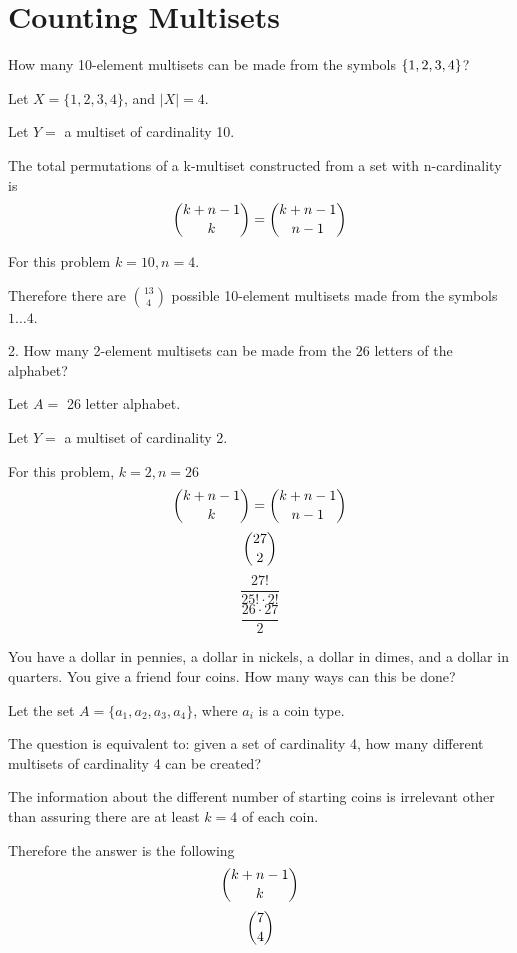 \documentclass[openany, 11pt]{book}
\begin{document}
\section{Counting Multisets}
\begin{exercise}{}{}
	How many 10-element multisets can be made from the symbols $\{1,2,3,4\}$?
	\begin{alist}
		\item Let $X= \{ 1,2,3,4\}$, and $|X|=4$.
		\item Let $Y=$ a multiset of cardinality 10.
		\item The total permutations of a k-multiset constructed from a set with
		n-cardinality is
		$$ \dbinom{k+n-1}{k} = \dbinom{k+n-1}{n-1} $$
		\item For this problem $k=10, n=4$.
		\item Therefore there are $\binom{13}{4}$ possible 10-element multisets made
		from the symbols $1\dots4$.
	\end{alist}
\end{exercise}

\begin{exercise}{}{}
	2. How many 2-element multisets can be made from the 26 letters of the alphabet?
	\begin{alist}
		\item Let $A=$ 26 letter alphabet.
		\item Let $Y=$ a multiset of cardinality 2.
		\item For this problem, $k=2, n=26$
		$$ \dbinom{k+n-1}{k} = \dbinom{k+n-1}{n-1} $$
		$$ \dbinom{27}{2}$$
		$$ \dfrac{27!}{25!\cdot2!}$$
		$$ \dfrac{26\cdot27}{2}$$
	\end{alist}
\end{exercise}

\begin{exercise}{}{}
	You have a dollar in pennies, a dollar in nickels, a dollar in dimes, and a dollar in quarters. You give a friend four coins. How many ways can this be done?
	\begin{alist}
		\item Let the set $A= \{a_1, a_2, a_3, a_4\}$, where $a_i$ is a coin type.
		\item The question is equivalent to: given a set of cardinality 4, how many
		different multisets of cardinality 4 can be created?
		\item The information about the different number of starting coins is
		irrelevant other than assuring there are at least $k=4$ of each coin.
		\item Therefore the answer is the following
		$$ \dbinom{k+n-1}{k} $$
		$$ \dbinom{7}{4}$$
	\end{alist}
\end{exercise}
\end{document}
